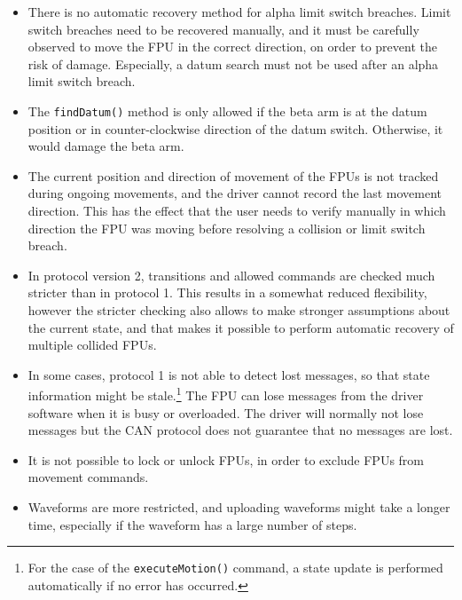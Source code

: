 \documentclass[11pt,a4paper]{report}
\begin{document}
\begin{itemize}
\item There is no automatic recovery method for alpha
  limit switch breaches. Limit switch breaches need
  to be recovered manually, and it must be carefully
  observed to move the FPU in the correct direction,
  on order to prevent the risk of damage. Especially,
  a datum search must not be used after an alpha limit switch
  breach.

\item The \texttt{findDatum()} method is only allowed if the beta arm
  is at the datum position or in counter-clockwise direction of the
  datum switch. Otherwise, it would damage the beta arm.

\item The current position and direction of movement of the FPUs is
  not tracked during ongoing movements, and the driver cannot record
  the last movement direction. This has the effect that the user needs
  to verify manually in which direction the FPU was moving before
  resolving a collision or limit switch breach.

\item In protocol version 2, transitions and allowed commands are
  checked much stricter than in protocol 1.  This results in a
  somewhat reduced flexibility, however the stricter checking also
  allows to make stronger assumptions about the current state, and
  that makes it possible to perform automatic recovery of multiple
  collided FPUs.
  
\item In some cases, protocol 1 is not able to detect lost messages,
  so that state information might be stale.\footnote{For the case of
    the \texttt{executeMotion()} command, a state update is performed
    automatically if no error has occurred.} The FPU can lose messages
  from the driver software when it is busy or overloaded. The driver
  will normally not lose messages but the CAN protocol does not
  guarantee that no messages are lost.
  

\item It is not possible to lock or unlock FPUs, in order to exclude
  FPUs from movement commands.
  
\item Waveforms are more restricted, and uploading waveforms might
  take a longer time, especially if the waveform has a large number of
  steps.
  
\end{itemize}
\end{document}
